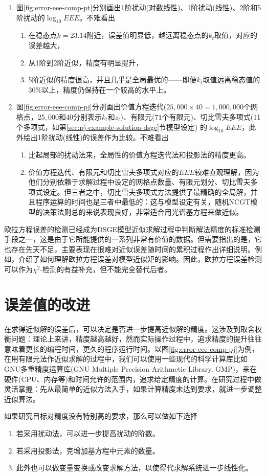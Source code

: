 \begin{enumerate}
  \item 图\ref{fig:error-eee-comp-pt}分别画出1阶扰动(对数线性)、1阶扰动(线性)、2阶和5阶扰动的$\log_{10}EEE$。不难看出
\begin{enumerate}
  \item 在稳态点$k=23.14$附近，误差值明显低，越远离稳态点的$k_{t}$取值，对应的误差越大，
  \item 从1阶到2阶近似，精度有明显提升，
  \item 5阶近似的精度很高，并且几乎是全局最优的——即便$k_{t}$取值远离稳态值的30\%以上，精度仍保持在一个较高的水平上。
\end{enumerate}

\item 图\ref{fig:error-eee-comp-pj}分别画出价值方程迭代($25,000 \times 40 = 1,000,000$个网格点，$25,000$和$40$分别表示$k_{t}$和$z_{t}$)、有限元($71$个有限元)、切比雪夫多项式(11个多项式，如第\ref{sec:pj-example-solution-dsge}节模型设定)
的$ \log_{10} EEE$，此外绘出1阶扰动(线性)的误差作为比较。不难看出
\begin{enumerate}
  \item 比起局部的扰动法来，全局性的价值方程迭代法和投影法的精度更高。

  \item 价值方程迭代、有限元和切比雪夫多项式对应的$EEE$较难直观理解，因为他们分别依赖于求解过程中设定的网格点数量、有限元划分、切比雪夫多项式设定。但三者之中，切比雪夫多项式方法提供了最精确的全局解，并且程序运算的时间也是三者中最低的：这与模型设定有关，随机NCGT模型的决策法则总的来说表现良好，非常适合用光谱基方程来做近似。
\end{enumerate}
\end{enumerate}
欧拉方程误差的检测已经成为DSGE模型近似求解过程中判断解法精度的标准检测手段之一，这是由于它所能提供的一系列非常有价值的数据。但需要指出的是，它也存在先天不足，主要表现在很难对近似误差随时间的累积过程作出详细说明。例如，\cite{Santos:2005dz}介绍了如何理解欧拉方程误差对模型近似矩的影响。因此，欧拉方程误差检测可以作为$\chi^{2}$-检测的有益补充，但不能完全替代后者。

\section{误差值的改进}
\label{eq:error-improvement}
在求得近似解的误差后，可以决定是否进一步提高近似解的精度。这涉及到取舍权衡问题：理论上来讲，精度越高越好，然而实际操作过程中，追求精度的提升往往意味着更长的编程时间，更久的程序运行时间。以图\ref{fig:error-eee-comp-pj}为例，在用有限元法作近似求解的过程中，我们可以使用一些现代的科学计算库比如GNU多重精度运算库(GNU Multiple Precision Arithmetic Library, GMP)，来在硬件(CPU、内存等)和时间允许的范围内，追求给定精度的计算。在研究过程中做灵活掌握：先从最简单的近似方法入手，如果计算精度未达到要求，就进一步调整近似算法。

如果研究目标对精度没有特别高的要求，那么可以做如下选择
\begin{enumerate}
  \item 若采用扰动法，可以进一步提高扰动的阶数。
  \item 若采用投影法，克增加基方程中元素的数量。
  \item 此外也可以做变量变换或改变求解方法，以使得代求解系统进一步线性化。
\end{enumerate}

